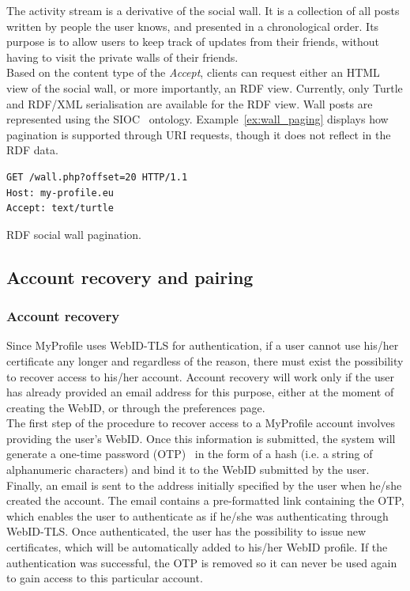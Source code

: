 The activity stream is a derivative of the social wall. It is a collection of all posts written by people the user knows, and presented in a chronological order. Its purpose is to allow users to keep track of updates from their friends, without having to visit the private walls of their friends.\\

Based on the content type of the \textit{Accept}, clients can request either an HTML view of the social wall, or more importantly, an RDF view. Currently, only Turtle and RDF/XML serialisation are available for the RDF view. Wall posts are represented using the SIOC~\cite{breslin2005towards} ontology. Example~\ref{ex:wall_paging} displays how pagination is supported through URI requests, though it does not reflect in the RDF data.

\begin{example}[h]
\begin{verbatim}
GET /wall.php?offset=20 HTTP/1.1
Host: my-profile.eu
Accept: text/turtle
\end{verbatim}
\caption{RDF social wall pagination.}
\label{ex:wall_paging}
\end{example}

\subsection{Account recovery and pairing}

\subsubsection{Account recovery}
Since MyProfile uses WebID-TLS for authentication, if a user cannot use his/her certificate any longer and regardless of the reason, there must exist the possibility to recover access to his/her account. Account recovery will work only if the user has already provided an email address for this purpose, either at the moment of creating the WebID, or through the preferences page.\\

The first step of the procedure to recover access to a MyProfile account involves providing the user's WebID. Once this information is submitted, the system will generate a one-time password (OTP)~\cite{haller1995s} in the form of a hash (i.e. a string of alphanumeric characters) and bind it to the WebID submitted by the user. Finally, an email is sent to the address initially specified by the user when he/she created the account. The email contains a pre-formatted link containing the OTP, which enables the user to authenticate as if he/she was authenticating through WebID-TLS. Once authenticated, the user has the possibility to issue new certificates, which will be automatically added to his/her WebID profile. If the authentication was successful, the OTP is removed so it can never be used again to gain access to this particular account.

